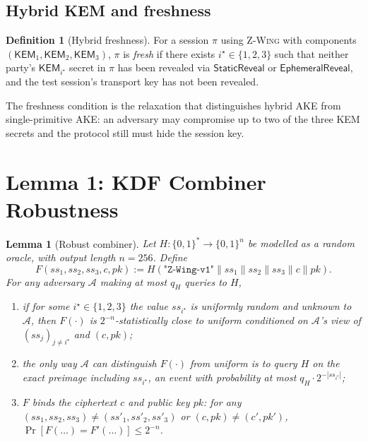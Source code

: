 \documentclass[11pt,a4paper]{article}
\newtheorem{lemma}[theorem]{Lemma}
\theoremstyle{definition}
\newtheorem{definition}[theorem]{Definition}
\theoremstyle{remark}
\newcommand{\KEM}{\ensuremath{\mathsf{KEM}}}
\newcommand{\zwing}{\textsc{Z-Wing}}
\newcommand{\BB}{\ensuremath{\{0,1\}}}
\begin{document}
\subsection{Hybrid KEM and freshness}

\begin{definition}[Hybrid freshness]\label{def:fresh}
For a session $\pi$ using \zwing{} with components $(\KEM_1, \KEM_2, \KEM_3)$,
$\pi$ is \emph{fresh} if there exists $i^\star \in \{1, 2, 3\}$ such that
neither party's $\KEM_{i^\star}$ secret in $\pi$ has been revealed via
$\mathsf{StaticReveal}$ or $\mathsf{EphemeralReveal}$, and the test
session's transport key has not been revealed.
\end{definition}

The freshness condition is the relaxation that distinguishes hybrid AKE from
single-primitive AKE: an adversary may compromise up to two of the three
KEM secrets and the protocol still must hide the session key.

\section{Lemma 1: KDF Combiner Robustness}\label{sec:lem1}

\begin{lemma}[Robust combiner]\label{lem:combiner}
Let $H : \BB^* \to \BB^{n}$ be modelled as a random oracle, with output
length $n = 256$. Define
\[
F(ss_1, ss_2, ss_3, c, pk) := H(\texttt{"Z-Wing-v1"} \parallel ss_1 \parallel ss_2 \parallel ss_3 \parallel c \parallel pk).
\]
For any adversary $\mathcal{A}$ making at most $q_H$ queries to $H$,
\begin{enumerate}
\item if for some $i^\star \in \{1, 2, 3\}$ the value $ss_{i^\star}$ is
uniformly random and unknown to $\mathcal{A}$, then $F(\cdot)$ is
$2^{-n}$-statistically close to uniform conditioned on
$\mathcal{A}$'s view of $(ss_j)_{j \neq i^\star}$ and $(c, pk)$;
\item the only way $\mathcal{A}$ can distinguish $F(\cdot)$ from uniform is
to query $H$ on the exact preimage including $ss_{i^\star}$, an event with
probability at most $q_H \cdot 2^{-|ss_{i^\star}|}$;
\item $F$ binds the ciphertext $c$ and public key $pk$: for any
$(ss_1, ss_2, ss_3) \neq (ss'_1, ss'_2, ss'_3)$ or
$(c, pk) \neq (c', pk')$, $\Pr[F(\ldots) = F'(\ldots)] \le 2^{-n}$.
\end{enumerate}
\end{lemma}
\end{document}
